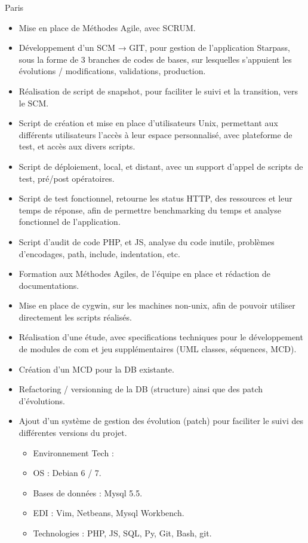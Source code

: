 \documentclass[10pt,a4paper,sans]{moderncv}
\begin{document}
{Paris}{}{
    \begin{itemize}%
        \item Mise en place de Méthodes Agile, avec SCRUM.
        \item Développement d'un SCM → GIT, pour gestion de l'application Starpass, sous la forme de 3 branches de codes de bases, sur lesquelles s'appuient les évolutions / modifications, validations, production.
        \item Réalisation de script de snapshot, pour faciliter le suivi et la transition, vers le SCM.
        \item Script de création et mise en place d'utilisateurs Unix, permettant aux différents utilisateurs l'accès à leur espace personnalisé, avec plateforme de test, et accès aux divers scripts.
        \item Script de déploiement, local, et distant, avec un support d'appel de scripts de test, pré/post opératoires.
        \item Script de test fonctionnel, retourne les status HTTP, des ressources et leur temps de réponse, afin de permettre benchmarking du temps et analyse fonctionnel de l'application.
        \item Script d'audit de code PHP, et JS, analyse du code inutile, problèmes d'encodages, path, include, indentation, etc.
        \item Formation aux Méthodes Agiles, de l'équipe en place et rédaction de documentations.
        \item Mise en place de cygwin, sur les machines non-unix, afin de pouvoir utiliser directement les scripts réalisés.
        \item Réalisation d'une étude, avec specifications techniques pour le développement de modules de com et jeu supplémentaires (UML classes, séquences, MCD).
        \item Création d'un MCD pour la DB existante.
        \item Refactoring / versionning de la DB (structure) ainsi que des patch d'évolutions.
        \item Ajout d'un système de gestion des évolution (patch) pour faciliter le suivi des différentes versions du projet.
            \begin{itemize}%
                \item Environnement Tech :
                \item OS : Debian 6 / 7.
                \item Bases de données : Mysql 5.5.
                \item EDI : Vim, Netbeans, Mysql Workbench.
                \item Technologies : PHP, JS, SQL, Py, Git, Bash, git.
            \end{itemize}
\end{itemize}}
\end{document}
